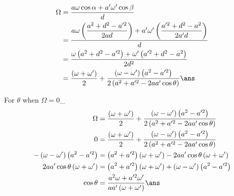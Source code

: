 \documentclass{article}
\begin{document}
\addtolength{\jot}{3ex}
\def\vp{a\omega\cos\alpha}
\def\vq{a'\omega'\cos\beta}
\def\cosa{\left(\dfrac{a^2+d^2-a'^2}{2ad}\right)}
\def\cosb{\left(\dfrac{a'^2+d^2-a^2}{2a'd}\right)}
\begin{align*}
\Omega &= \dfrac{\vp + \vq}{d}\\
	&= \dfrac{a\omega\cosa +a'\omega'\cosb}{d}\\
	&=\dfrac{\omega\left( a^2+d^2-a'^2 \right) +\omega'\left(a'^2+d^2-a^2  \right)}{2d^2}\\
	&=\dfrac{\left( \omega+\omega' \right)}{2} + \dfrac{\left(\omega-\omega'\right)\left(a^2-a'^2\right)}{2\left( a^2+a'^2-2aa'\cos\theta \right)}\ans
\end{align*}
\pagebreak

For $\theta$ when $\Omega = 0$\_
\begin{align*}
\Omega &=\dfrac{\left( \omega+\omega' \right)}{2} + \dfrac{\left(\omega-\omega'\right)\left(a^2-a'^2\right)}{2\left( a^2+a'^2-2aa'\cos\theta \right)}\\
0 &=\dfrac{\left( \omega+\omega' \right)}{2} + \dfrac{\left(\omega-\omega'\right)\left(a^2-a'^2\right)}{2\left( a^2+a'^2-2aa'\cos\theta \right)}\\
-\left(\omega-\omega'\right)\left( a^2-a'^2\right) &= \left(a^2+a'^2\right) \left(\omega+\omega'\right) -2aa'\cos\theta\left(\omega+\omega'\right) \\
2aa'\cos\theta\left(\omega+\omega'\right) &= \left(a^2+a'^2\right) \left(\omega+\omega'\right) + \left(\omega-\omega'\right)\left( a^2-a'^2\right)\\
\cos\theta &= \dfrac{a^2\omega+a'^2\omega'}{aa'\left(\omega+\omega'\right)} \ans
\end{align*}


\pagebreak


\vspace*{\fill}
\begin{center}
	\fbox{\qrcode[height=2cm]{\gdrive}}
\end{center}
\vspace*{\fill}

\pagebreak

\vspace*{\fill}
\begin{center}
\end{center}
\vspace*{\fill}
\end{document}
